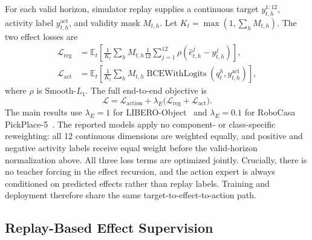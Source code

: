 \documentclass[letterpaper,10pt,conference]{ieeeconf}
\begin{document}
For each valid horizon, simulator replay supplies a continuous target $y_{t,h}^{1:12}$, activity label $y_{t,h}^{\mathrm{act}}$, and validity mask $M_{t,h}$.
Let $K_t=\max(1,\sum_h M_{t,h})$.
The two effect losses are
\begin{align}
\mathcal{L}_{\mathrm{reg}}
&=\mathbb{E}_t\!\left[\frac{1}{K_t}\sum_h M_{t,h}
  \frac{1}{12}\sum_{j=1}^{12}
  \rho\!\left(\hat e_{t,h}^{j}-y_{t,h}^{j}\right)\right], \\
\mathcal{L}_{\mathrm{act}}
&=\mathbb{E}_t\!\left[\frac{1}{K_t}\sum_h M_{t,h}
  \operatorname{BCEWithLogits}
  (q_t^h,y_{t,h}^{\mathrm{act}})\right],
\label{eq:effect_losses}
\end{align}
where $\rho$ is Smooth-$L_1$.
The full end-to-end objective is
\begin{equation}
\mathcal{L}=\mathcal{L}_{\mathrm{action}}
+\lambda_E\bigl(\mathcal{L}_{\mathrm{reg}}+\mathcal{L}_{\mathrm{act}}\bigr).
\label{eq:objective}
\end{equation}
The main results use $\lambda_E=1$ for LIBERO-Object~\cite{libero} and $\lambda_E=0.1$ for RoboCasa PickPlace-5~\cite{robocasa2024}.
The reported models apply no component- or class-specific reweighting: all 12 continuous dimensions are weighted equally, and positive and negative activity labels receive equal weight before the valid-horizon normalization above.
All three loss terms are optimized jointly.
Crucially, there is no teacher forcing in the effect recursion, and the action expert is always conditioned on predicted effects rather than replay labels.
Training and deployment therefore share the same target-to-effect-to-action path.

\subsection{Replay-Based Effect Supervision}
\label{sec:effect_supervision}
\end{document}
